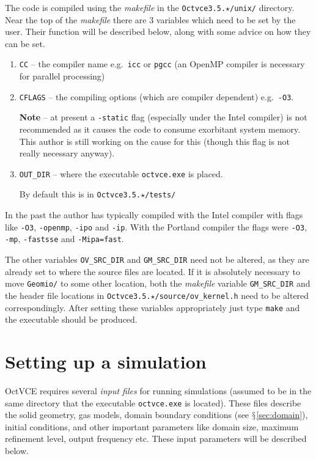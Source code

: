 \documentclass[pdftex, 12pt, a4paper]{report}
\begin{document}
The code is compiled using the \emph{makefile} in the \verb'Octvce3.5.'$\star$\verb'/unix/' directory.  
Near the top of the \emph{makefile} there are 3 variables which need to be set by the user.  Their function will be described 
below, along with some advice on how they can be set. 

\begin{enumerate}
\item \verb'CC' -- the compiler name e.g.\ \verb'icc' or \verb'pgcc' (an OpenMP compiler \cite{openmp:manual} is necessary for 
  parallel processing)
\item \verb'CFLAGS' -- the compiling options (which are compiler dependent) e.g.\ \verb'-O3'.

  \textbf{Note} -- at present a \verb'-static' flag (especially under the Intel compiler) is not recommended as it causes the code to 
  consume exorbitant system memory.  This author is still working on the cause for this (though this flag is not really necessary anyway).
\item \verb'OUT_DIR' -- where the executable \verb'octvce.exe' is placed.  

By default this is in \verb'Octvce3.5.'$\star$\verb'/tests/'
\end{enumerate}

In the past the author has typically compiled with the Intel compiler with flags like \verb'-O3', \verb'-openmp', \verb'-ipo'
and \verb'-ip'.  With the Portland compiler the flags were \verb'-O3', \verb'-mp', \verb'-fastsse' and \verb'-Mipa=fast'.

The other variables \verb'OV_SRC_DIR' and \verb'GM_SRC_DIR' need not be altered, as they are already set to where the source files
are located.  If it is absolutely necessary to move \verb'Geomio/' to some other location, both the \emph{makefile} variable
\verb'GM_SRC_DIR' and the header file locations in \verb'Octvce3.5.'$\star$\verb'/source/ov_kernel.h' need to be altered correspondingly.
After setting these variables appropriately just type \verb'make' and the executable should be produced.

\chapter{Setting up a simulation}\label{sec:sim_setup}

OctVCE requires several \emph{input files} for running simulations (assumed to be in the same directory that the executable \verb'octvce.exe' is located).  These files describe the solid geometry,
gas models, domain boundary conditions (see $\mathsection$\ref{sec:domain}), initial conditions, and other important
parameters like domain size, maximum refinement level, output frequency etc.  These input parameters will be
described below.  
\end{document}
